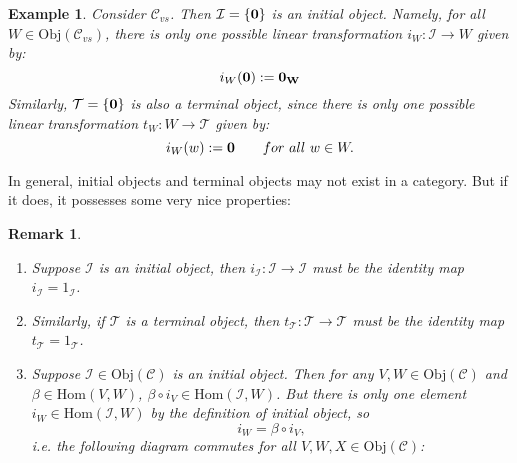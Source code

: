 \documentclass[12pt]{amsbook}
\newtheorem{example}[theorem]{Example}
\newtheorem{remark}[theorem]{Remark}
\begin{document}
\begin{example}
    Consider $\mathcal{C}_{vs}$. Then $\mathcal{I} = \{\bf 0 \}$ is an initial object. Namely, for all $W \in \mathrm{Obj}(\mathcal{C}_{vs})$, 
    there is only one possible linear transformation $i_W: \mathcal{I} \to W$ given by:
    $$i_W(\bf 0) := \bf 0_W$$
    Similarly, $\mathcal{T} = \{\bf 0 \}$ is also a terminal object, since there is only one possible linear transformation $t_W: W \to \mathcal{T}$
    given by:
    $$i_W(w) := {\bf 0} \quad \quad for\ all\ w\in W. $$
\end{example}

In general, initial objects and terminal objects may not exist in a category. But if it does, it possesses some very nice properties: 
\begin{remark}
\begin{enumerate}
    \item Suppose $\mathcal{I}$ is an initial object, then $i_{\mathcal{I}}: \mathcal{I} \to \mathcal{I}$ must be the identity map $i_{\mathcal{I}} = 1_{\mathcal{I}}$. 
    
    \item Similarly, if $\mathcal{T}$ is a terminal object, then $t_{\mathcal{T}}: \mathcal{T} \to \mathcal{T}$ must be the identity map $t_{\mathcal{T}} = 1_{\mathcal{T}}$. 

    \item Suppose $\mathcal{I} \in \mathrm{Obj}(\mathcal{C})$ is an initial object. Then for any $V, W \in \mathrm{Obj}(\mathcal{C})$ and $\beta \in \mathrm{Hom}(V,W)$, $\beta \circ i_V \in \mathrm{Hom}(\mathcal{I},W)$. But there is only one element $i_W \in \mathrm{Hom}(\mathcal{I},W)$ by the definition of initial object, so
    $$i_W = \beta \circ i_V,$$
    i.e. the following diagram commutes for all $V, W, X \in \mathrm{Obj}(\mathcal{C})$:
    \begin{center}
\end{center}


\end{enumerate}
\end{remark}
\end{document}
